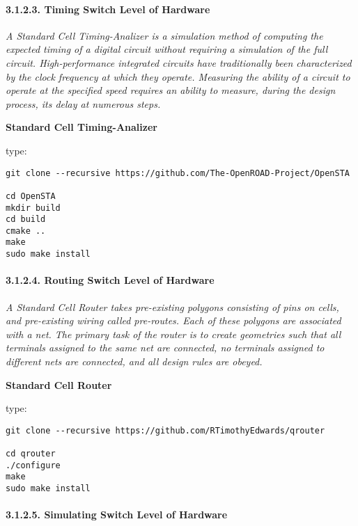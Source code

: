 \documentclass[]{article}
\let\oldparagraph\paragraph
\renewcommand{\paragraph}[1]{\oldparagraph{#1}\mbox{}}
\begin{document}
\paragraph{3.1.2.3. Timing Switch Level of
Hardware}\label{timing-switch-level-of-hardware}

\emph{A Standard Cell Timing-Analizer is a simulation method of
computing the expected timing of a digital circuit without requiring a
simulation of the full circuit. High-performance integrated circuits
have traditionally been characterized by the clock frequency at which
they operate. Measuring the ability of a circuit to operate at the
specified speed requires an ability to measure, during the design
process, its delay at numerous steps.}

\textbf{Standard Cell Timing-Analizer}

type:

\begin{verbatim}
git clone --recursive https://github.com/The-OpenROAD-Project/OpenSTA

cd OpenSTA
mkdir build
cd build
cmake ..
make
sudo make install
\end{verbatim}

\paragraph{3.1.2.4. Routing Switch Level of
Hardware}\label{routing-switch-level-of-hardware}

\emph{A Standard Cell Router takes pre-existing polygons consisting of
pins on cells, and pre-existing wiring called pre-routes. Each of these
polygons are associated with a net. The primary task of the router is to
create geometries such that all terminals assigned to the same net are
connected, no terminals assigned to different nets are connected, and
all design rules are obeyed.}

\textbf{Standard Cell Router}

type:

\begin{verbatim}
git clone --recursive https://github.com/RTimothyEdwards/qrouter

cd qrouter
./configure
make
sudo make install
\end{verbatim}

\paragraph{3.1.2.5. Simulating Switch Level of
Hardware}\label{simulating-switch-level-of-hardware}
\end{document}
